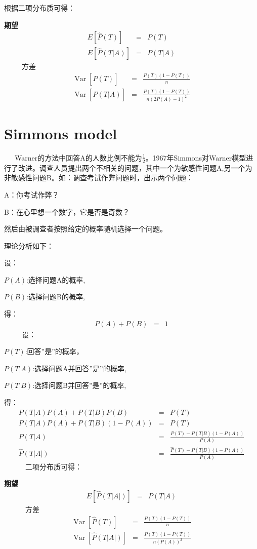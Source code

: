\documentclass{article}
\newcommand{\tmop}[1]{\ensuremath{\operatorname{#1}}}
\newcommand{\tmstrong}[1]{\textbf{#1}}
\begin{document}
\begin{CJK*}{UTF8}{gbsn}
根据二项分布质可得：

{\tmstrong{期望}}
\begin{eqnarray*}
  E [ \hat{P} ( T ) ] & = & P ( T )\\
  E [ \hat{P} ( T|A ) ] & = & P ( T|A )
\end{eqnarray*}
\ \ \ \ \ 方差
\begin{eqnarray*}
  \tmop{Var} [ \hat{P} ( T ) ] & = & \frac{P ( T ) ( 1-P ( T ) )}{n}\\
  \tmop{Var} [ \hat{P} ( T|A ) ] & = & \frac{P ( T ) ( 1-P ( T ) )}{n ( 2P ( A
  ) -1 )^{2}}
\end{eqnarray*}

\section{Simmons model}

\ \ \
Warner的方法中回答A的人数比例不能为$\frac{1}{2}$。1967年Simmons对Warner模型进行了改进。调查人员提出两个不相关的问题，其中一个为敏感性问题A,另一个为非敏感性问题B。如：调查考试作弊问题时，出示两个问题：

A：你考试作弊？

B：在心里想一个数字，它是否是奇数？

然后由被调查者按照给定的概率随机选择一个问题。

理论分析如下：

设：

$P ( A )$:选择问题A的概率,

$P ( B )$:选择问题B的概率,

得：
\begin{eqnarray*}
  P ( A ) +P ( B ) & = & 1
\end{eqnarray*}
\ \ \ \ \ 设：

$P ( T )$:回答''是''的概率，

$P ( T|A )$:选择问题A并回答''是''的概率,

$P ( T|B )$:选择问题B并回答''是''的概率,

得：
\begin{eqnarray*}
  P ( T|A ) P ( A ) +P ( T|B ) P ( B ) & = & P ( T )\\
  P ( T|A ) P ( A ) +P ( T|B ) ( 1-P ( A ) ) & = & P ( T )\\
  P ( T|A ) & = & \frac{P ( T ) -P ( T|B ) ( 1-P ( A ) )}{P ( A )}\\
  \hat{P} ( T | A | ) & = & \frac{\hat{P} ( T ) -P ( T|B ) ( 1-P ( A ) )}{P (
  A )}
\end{eqnarray*}
\ \ \ \ \ \ 二项分布质可得：

{\tmstrong{期望}}
\begin{eqnarray*}
  E [ \hat{P} ( T | A | ) ] & = & P ( T|A )
\end{eqnarray*}
\ \ \ \ \ \ 方差
\begin{eqnarray*}
  \tmop{Var} [ \hat{P} ( T ) ] & = & \frac{P ( T ) ( 1-P ( T ) )}{n}\\
  \tmop{Var} [ \hat{P} ( T | A | ) ] & = & \frac{P ( T ) ( 1-P ( T ) )}{n ( P
  ( A ) )^{2}}
\end{eqnarray*}

\end{CJK*}
\end{document}
